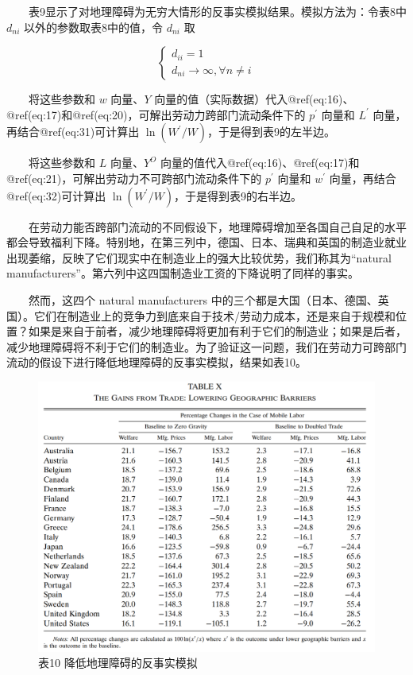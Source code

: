 \documentclass[]{tufte-handout}
\begin{document}
　　表9显示了对地理障碍为无穷大情形的反事实模拟结果。模拟方法为：令表8中
\(d_{ni}\) 以外的参数取表8中的值，令 \(d_{ni}\) 取

\[
\left\{\begin{array}{c}{d_{i i}=1} \\ {d_{n i}\rightarrow \infty, \forall n \neq i}\end{array}\right.
\]

　　将这些参数和 \(w\) 向量、\(Y\)
向量的值（实际数据）代入@ref(eq:16)、@ref(eq:17)和@ref(eq:20)，可解出劳动力跨部门流动条件下的
\(p^{\prime}\) 向量和 \(L^{\prime}\) 向量，再结合@ref(eq:31)可计算出
\(\ln \left(W^{\prime}/W\right)\)，于是得到表9的左半边。

　　将这些参数和 \(L\) 向量、\(Y^O\)
向量的值代入@ref(eq:16)、@ref(eq:17)和@ref(eq:21)，可解出劳动力不可跨部门流动条件下的
\(p^{\prime}\) 向量和 \(w^{\prime}\) 向量，再结合@ref(eq:32)可计算出
\(\ln \left(W^{\prime}/W\right)\)，于是得到表9的右半边。

　　在劳动力能否跨部门流动的不同假设下，地理障碍增加至各国自己自足的水平都会导致福利下降。特别地，在第三列中，德国、日本、瑞典和英国的制造业就业出现萎缩，反映了它们现实中在制造业上的强大比较优势，我们称其为``natural
manufacturers''。第六列中这四国制造业工资的下降说明了同样的事实。

　　然而，这四个 natural manufacturers
中的三个都是大国（日本、德国、英国）。它们在制造业上的竞争力到底来自于技术/劳动力成本，还是来自于规模和位置？如果是来自于前者，减少地理障碍将更加有利于它们的制造业；如果是后者，减少地理障碍将不利于它们的制造业。为了验证这一问题，我们在劳动力可跨部门流动的假设下进行降低地理障碍的反事实模拟，结果如表10。

\begin{figure}

{\centering \includegraphics[width=1\linewidth]{Figures/Table10} 

}

\caption[表10 降低地理障碍的反事实模拟]{表10 降低地理障碍的反事实模拟}\label{fig:t10}
\end{figure}
\end{document}

